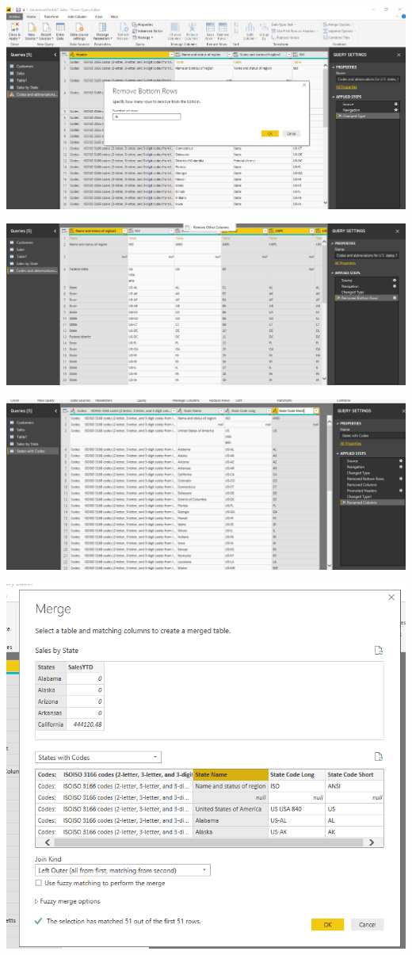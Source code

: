 	\begin{center}
	\includegraphics[width=15cm]{./Imagenes/EJER1T3(6)}
	\end{center}	

	\begin{center}
	\includegraphics[width=15cm]{./Imagenes/EJER1T3(7)}
	\end{center}	

	\begin{center}
	\includegraphics[width=15cm]{./Imagenes/EJER1T3(8)}
	\end{center}	

	\begin{center}
	\includegraphics[width=15cm]{./Imagenes/EJER1T3(9)}
	\end{center}	


